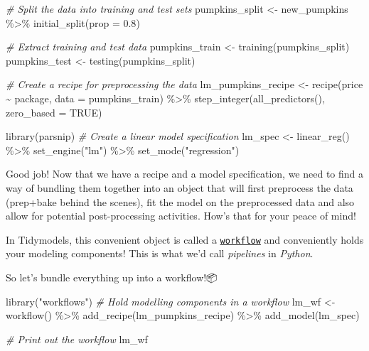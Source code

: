 \documentclass[
]{article}
\newenvironment{Shaded}{\begin{snugshade}}{\end{snugshade}}
\newcommand{\AttributeTok}[1]{\textcolor[rgb]{0.77,0.63,0.00}{#1}}
\newcommand{\CommentTok}[1]{\textcolor[rgb]{0.56,0.35,0.01}{\textit{#1}}}
\newcommand{\ConstantTok}[1]{\textcolor[rgb]{0.00,0.00,0.00}{#1}}
\newcommand{\FloatTok}[1]{\textcolor[rgb]{0.00,0.00,0.81}{#1}}
\newcommand{\FunctionTok}[1]{\textcolor[rgb]{0.00,0.00,0.00}{#1}}
\newcommand{\NormalTok}[1]{#1}
\newcommand{\OtherTok}[1]{\textcolor[rgb]{0.56,0.35,0.01}{#1}}
\newcommand{\SpecialCharTok}[1]{\textcolor[rgb]{0.00,0.00,0.00}{#1}}
\newcommand{\StringTok}[1]{\textcolor[rgb]{0.31,0.60,0.02}{#1}}
\begin{document}
\begin{Shaded}
\begin{Highlighting}[]
\CommentTok{\# Split the data into training and test sets}
\NormalTok{pumpkins\_split }\OtherTok{\textless{}{-}}\NormalTok{ new\_pumpkins }\SpecialCharTok{\%\textgreater{}\%} 
  \FunctionTok{initial\_split}\NormalTok{(}\AttributeTok{prop =} \FloatTok{0.8}\NormalTok{)}


\CommentTok{\# Extract training and test data}
\NormalTok{pumpkins\_train }\OtherTok{\textless{}{-}} \FunctionTok{training}\NormalTok{(pumpkins\_split)}
\NormalTok{pumpkins\_test }\OtherTok{\textless{}{-}} \FunctionTok{testing}\NormalTok{(pumpkins\_split)}



\CommentTok{\# Create a recipe for preprocessing the data}
\NormalTok{lm\_pumpkins\_recipe }\OtherTok{\textless{}{-}} \FunctionTok{recipe}\NormalTok{(price }\SpecialCharTok{\textasciitilde{}}\NormalTok{ package, }\AttributeTok{data =}\NormalTok{ pumpkins\_train) }\SpecialCharTok{\%\textgreater{}\%} 
  \FunctionTok{step\_integer}\NormalTok{(}\FunctionTok{all\_predictors}\NormalTok{(), }\AttributeTok{zero\_based =} \ConstantTok{TRUE}\NormalTok{)}


\FunctionTok{library}\NormalTok{(parsnip)}
\CommentTok{\# Create a linear model specification}
\NormalTok{lm\_spec }\OtherTok{\textless{}{-}} \FunctionTok{linear\_reg}\NormalTok{() }\SpecialCharTok{\%\textgreater{}\%} 
  \FunctionTok{set\_engine}\NormalTok{(}\StringTok{"lm"}\NormalTok{) }\SpecialCharTok{\%\textgreater{}\%} 
  \FunctionTok{set\_mode}\NormalTok{(}\StringTok{"regression"}\NormalTok{)}
\end{Highlighting}
\end{Shaded}

Good job! Now that we have a recipe and a model specification, we need
to find a way of bundling them together into an object that will first
preprocess the data (prep+bake behind the scenes), fit the model on the
preprocessed data and also allow for potential post-processing
activities. How's that for your peace of mind!🤩

In Tidymodels, this convenient object is called a
\href{https://workflows.tidymodels.org/}{\texttt{workflow}} and
conveniently holds your modeling components! This is what we'd call
\emph{pipelines} in \emph{Python}.

So let's bundle everything up into a workflow!📦

\begin{Shaded}
\begin{Highlighting}[]
\FunctionTok{library}\NormalTok{(}\StringTok{"workflows"}\NormalTok{)}
\CommentTok{\# Hold modelling components in a workflow}
\NormalTok{lm\_wf }\OtherTok{\textless{}{-}} \FunctionTok{workflow}\NormalTok{() }\SpecialCharTok{\%\textgreater{}\%} 
  \FunctionTok{add\_recipe}\NormalTok{(lm\_pumpkins\_recipe) }\SpecialCharTok{\%\textgreater{}\%} 
  \FunctionTok{add\_model}\NormalTok{(lm\_spec)}

\CommentTok{\# Print out the workflow}
\NormalTok{lm\_wf}
\end{Highlighting}
\end{Shaded}
\end{document}
